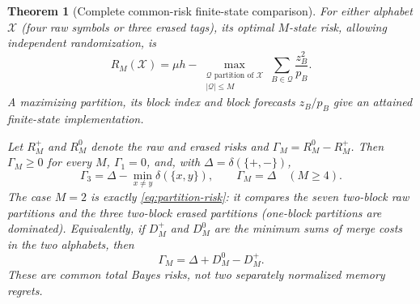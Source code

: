 \documentclass[11pt]{amsart}
\newtheorem{theorem}{Theorem}[section]
\theoremstyle{definition}\newtheorem{definition}[theorem]{Definition}
\theoremstyle{remark}\newtheorem{remark}[theorem]{Remark}
\begin{document}
\begin{theorem}[Complete common-risk finite-state comparison]\label{thm:finite-bit-value}
For either alphabet $\mathcal X$ (four raw symbols or three erased tags),
its optimal $M$-state risk, allowing independent randomization, is
\begin{equation}\label{eq:partition-risk}
 R_M(\mathcal X)=\mu h-
  \max_{\substack{\mathcal Q\text{ partition of }\mathcal X\\|\mathcal Q|\le M}}
             \sum_{B\in\mathcal Q}\frac{z_B^2}{p_B}.
\end{equation}
A maximizing partition, its block index and block forecasts $z_B/p_B$
give an attained finite-state implementation.

Let $R_M^+$ and $R_M^0$ denote the raw and erased risks and
$\Gamma_M=R_M^0-R_M^+$. Then $\Gamma_M\ge0$ for every $M$,
$\Gamma_1=0$, and, with $\Delta=\delta(\{+,-\})$,
\begin{equation}\label{eq:all-budgets}
 \Gamma_3=\Delta-\min_{x\ne y}\delta(\{x,y\}),\qquad
 \Gamma_M=\Delta\quad(M\ge4).
\end{equation}
The case $M=2$ is exactly \eqref{eq:partition-risk}: it compares the seven
two-block raw partitions and the three two-block erased partitions
(one-block partitions are dominated). Equivalently, if
$D_M^+$ and $D_M^0$ are the minimum sums of merge costs in the two
alphabets, then
\begin{equation}\label{eq:common-decomposition}
 \Gamma_M=\Delta+D_M^0-D_M^+.
\end{equation}
These are common \emph{total} Bayes risks, not two separately normalized
memory regrets.
\end{theorem}
\end{document}

